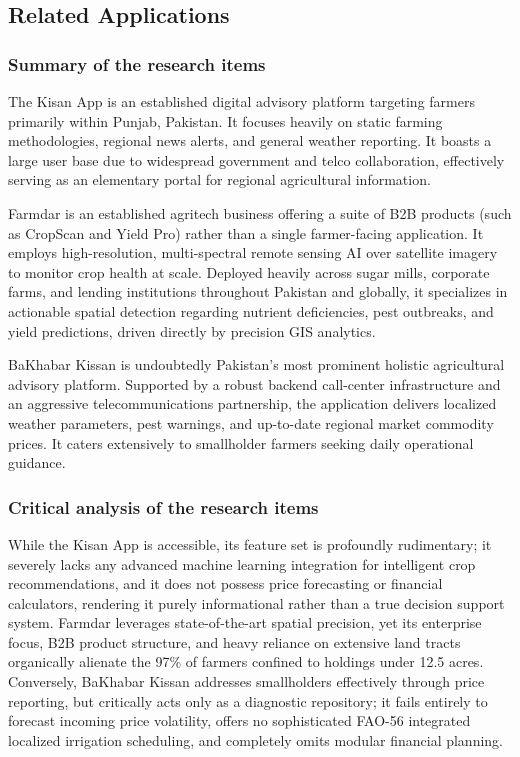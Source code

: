 \documentclass{FastFyp}
\begin{document}
\subsection{Related Applications}

\subsubsection{Summary of the research items}
The Kisan App \cite{kisanapp2024} is an established digital advisory platform targeting farmers primarily within Punjab, Pakistan. It focuses heavily on static farming methodologies, regional news alerts, and general weather reporting. It boasts a large user base due to widespread government and telco collaboration, effectively serving as an elementary portal for regional agricultural information.

Farmdar \cite{farmdar2024} is an established agritech business offering a suite of B2B products (such as CropScan and Yield Pro) rather than a single farmer-facing application. It employs high-resolution, multi-spectral remote sensing AI over satellite imagery to monitor crop health at scale. Deployed heavily across sugar mills, corporate farms, and lending institutions throughout Pakistan and globally, it specializes in actionable spatial detection regarding nutrient deficiencies, pest outbreaks, and yield predictions, driven directly by precision GIS analytics.

BaKhabar Kissan \cite{bakhabarkissan2024} is undoubtedly Pakistan's most prominent holistic agricultural advisory platform. Supported by a robust backend call-center infrastructure and an aggressive telecommunications partnership, the application delivers localized weather parameters, pest warnings, and up-to-date regional market commodity prices. It caters extensively to smallholder farmers seeking daily operational guidance.

\subsubsection{Critical analysis of the research items}
While the Kisan App \cite{kisanapp2024} is accessible, its feature set is profoundly rudimentary; it severely lacks any advanced machine learning integration for intelligent crop recommendations, and it does not possess price forecasting or financial calculators, rendering it purely informational rather than a true decision support system. Farmdar \cite{farmdar2024} leverages state-of-the-art spatial precision, yet its enterprise focus, B2B product structure, and heavy reliance on extensive land tracts organically alienate the 97\% of farmers confined to holdings under 12.5 acres. Conversely, BaKhabar Kissan \cite{bakhabarkissan2024} addresses smallholders effectively through price reporting, but critically acts only as a diagnostic repository; it fails entirely to forecast incoming price volatility, offers no sophisticated FAO-56 integrated localized irrigation scheduling, and completely omits modular financial planning.
\end{document}
